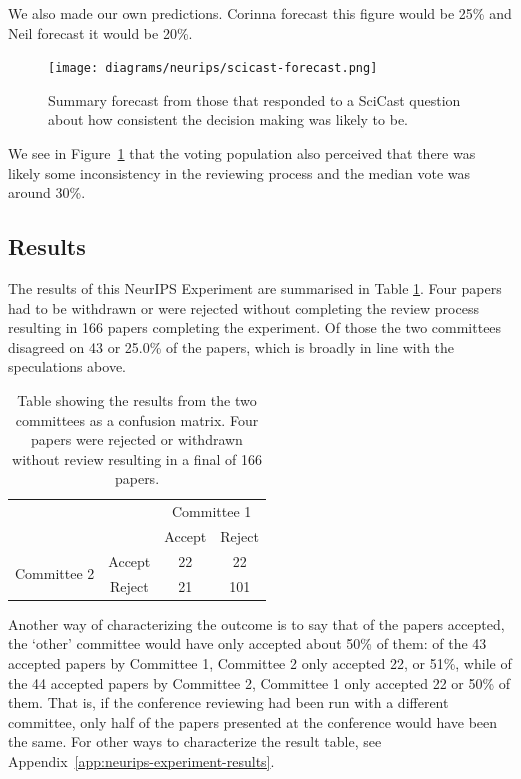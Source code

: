 \documentclass[twoside]{article}
\begin{document}
We also made our own predictions.  Corinna forecast this figure would be
25\% and Neil forecast it would be 20\%. 

\begin{figure}[htb]
\begin{center}
\texttt{[image: diagrams/neurips/scicast-forecast.png]}
\end{center}
\caption{Summary forecast from those that responded to a SciCast question about how consistent the decision making was likely to be.}
\label{scicast-forecast}
\end{figure}

We see in Figure~\ref{scicast-forecast} that the voting population also perceived that there was likely some inconsistency in the 
reviewing process and the median vote was around 30\%.

\subsection{Results}

The results of this NeurIPS Experiment are summarised in Table
\ref{table-neurips-experiment-results}. Four papers had to
be withdrawn or were rejected without completing the review process
resulting in 166 papers completing the experiment. Of those the two committees disagreed
on 43 or 25.0\% of the papers, which is broadly in line with the speculations above.

\begin{table}[htb]
\caption{Table showing the results from the two committees as a
  confusion matrix. Four papers were rejected or withdrawn without
  review resulting in a final of 166 papers.}
\label{table-neurips-experiment-results}
\centering
\begin{tabular}{lc|c|c|}
& & \multicolumn{2}{c}{Committee 1} \\
& & Accept & Reject \\ \hline
\multirow{2}{*}{Committee 2} & Accept & 22 & 22 \\
& Reject & 21 & 101 
\end{tabular}
\end{table}

Another way of characterizing the outcome is to say that of the papers
accepted, the `other' committee would have only accepted about 50\% of them:
of the 43 accepted papers by Committee 1, Committee 2 only accepted
22, or 51\%, while of the 44 accepted papers by Committee 2, Committee
1 only accepted 22 or 50\% of them. That is, if the conference
reviewing had been run with a different committee, only half of the
papers presented at the conference would have been the same. For other
ways to characterize the result table, see Appendix~\ref{app:neurips-experiment-results}.
\end{document}
